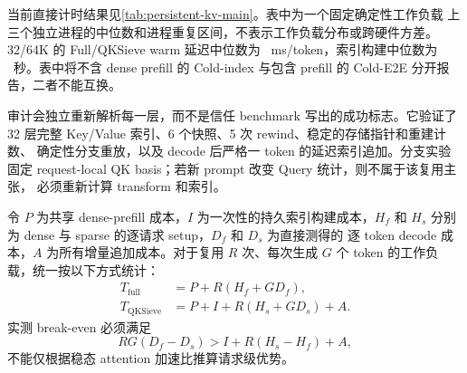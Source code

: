 \begin{table}[h]
\label{tab:persistent-kv-protocol}
\centering
{}
\end{table}

当前直接计时结果见\cref{tab:persistent-kv-main}。表中为一个固定确定性工作负载
上三个独立进程的中位数和进程重复区间，不表示工作负载分布或跨硬件方差。
32/64K 的 Full/QKSieve warm 延迟中位数为
\QKSievePersistentWarmLatencyText\ ms/token，索引构建中位数为
\QKSievePersistentBuildText\ 秒。表中将不含 dense prefill 的 Cold-index
与包含 prefill 的 Cold-E2E 分开报告，二者不能互换。

审计会独立重新解析每一层，而不是信任 benchmark 写出的成功标志。它验证了
32 层完整 Key/Value 索引、6 个快照、5 次 rewind、稳定的存储指针和重建计数、
确定性分支重放，以及 decode 后严格一 token 的延迟索引追加。分支实验固定
request-local QK basis；若新 prompt 改变 Query 统计，则不属于该复用主张，
必须重新计算 transform 和索引。

令 $P$ 为共享 dense-prefill 成本，$I$ 为一次性的持久索引构建成本，$H_f$ 和
$H_s$ 分别为 dense 与 sparse 的逐请求 setup，$D_f$ 和 $D_s$ 为直接测得的
逐 token decode 成本，$A$ 为所有增量追加成本。对于复用 $R$ 次、每次生成
$G$ 个 token 的工作负载，统一按以下方式统计：
\begin{align}
T_{\mathrm{full}} &= P + R(H_f + G D_f), \\
T_{\mathrm{QKSieve}} &= P + I + R(H_s + G D_s) + A.
\end{align}
实测 break-even 必须满足
\begin{equation}
R G(D_f-D_s) > I + R(H_s-H_f) + A,
\label{eq:persistent-break-even}
\end{equation}
不能仅根据稳态 attention 加速比推算请求级优势。

